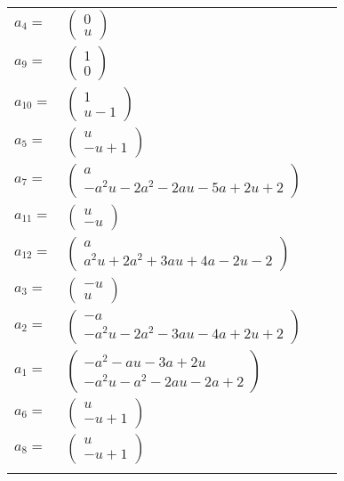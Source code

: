 \documentclass[1p]{elsarticle_modified}
\theoremstyle{definition}
\begin{document}
\begin{tabular}{m{7pt} m{180pt} m{7pt} m{180pt} }
\flushright $a_{4}=$&$\begin{pmatrix}0\\u\end{pmatrix}$ \\
\flushright $a_{9}=$&$\begin{pmatrix}1\\0\end{pmatrix}$ \\
\flushright $a_{10}=$&$\begin{pmatrix}1\\u-1\end{pmatrix}$ \\
\flushright $a_{5}=$&$\begin{pmatrix}u\\- u+1\end{pmatrix}$ \\
\flushright $a_{7}=$&$\begin{pmatrix}a\\- a^2 u-2 a^2-2 a u-5 a+2 u+2\end{pmatrix}$ \\
\flushright $a_{11}=$&$\begin{pmatrix}u\\- u\end{pmatrix}$ \\
\flushright $a_{12}=$&$\begin{pmatrix}a\\a^2 u+2 a^2+3 a u+4 a-2 u-2\end{pmatrix}$ \\
\flushright $a_{3}=$&$\begin{pmatrix}- u\\u\end{pmatrix}$ \\
\flushright $a_{2}=$&$\begin{pmatrix}- a\\- a^2 u-2 a^2-3 a u-4 a+2 u+2\end{pmatrix}$ \\
\flushright $a_{1}=$&$\begin{pmatrix}- a^2- a u-3 a+2 u\\- a^2 u- a^2-2 a u-2 a+2\end{pmatrix}$ \\
\flushright $a_{6}=$&$\begin{pmatrix}u\\- u+1\end{pmatrix}$ \\
\flushright $a_{8}=$&$\begin{pmatrix}u\\- u+1\end{pmatrix}$\\&\end{tabular}
\end{document}
